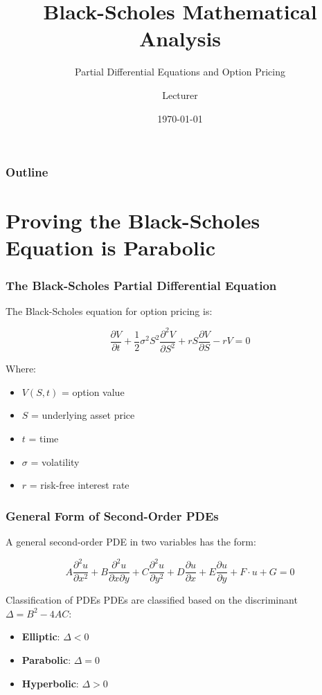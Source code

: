\documentclass{beamer}
\title{Black-Scholes Mathematical Analysis}
\subtitle{Partial Differential Equations and Option Pricing}
\author{Lecturer}
\date{\today}
\begin{document}
\begin{frame}
\titlepage
\end{frame}

\begin{frame}
\frametitle{Outline}
\tableofcontents
\end{frame}

\section{Proving the Black-Scholes Equation is Parabolic}

\begin{frame}
\frametitle{The Black-Scholes Partial Differential Equation}
The Black-Scholes equation for option pricing is:

$$\frac{\partial V}{\partial t} + \frac{1}{2}\sigma^2 S^2 \frac{\partial^2 V}{\partial S^2} + rS \frac{\partial V}{\partial S} - rV = 0$$

Where:
\begin{itemize}
\item $V(S,t)$ = option value
\item $S$ = underlying asset price
\item $t$ = time
\item $\sigma$ = volatility
\item $r$ = risk-free interest rate
\end{itemize}
\end{frame}

\begin{frame}
\frametitle{General Form of Second-Order PDEs}
A general second-order PDE in two variables has the form:

$$A\frac{\partial^2 u}{\partial x^2} + B\frac{\partial^2 u}{\partial x \partial y} + C\frac{\partial^2 u}{\partial y^2} + D\frac{\partial u}{\partial x} + E\frac{\partial u}{\partial y} + F \cdot u + G = 0$$

\begin{block}{Classification of PDEs}
PDEs are classified based on the discriminant $\Delta = B^2 - 4AC$:
\begin{itemize}
\item \textbf{Elliptic}: $\Delta < 0$
\item \textbf{Parabolic}: $\Delta = 0$
\item \textbf{Hyperbolic}: $\Delta > 0$
\end{itemize}
\end{block}
\end{frame}
\end{document}
